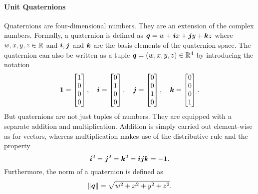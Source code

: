 		\paragraph{Unit Quaternions}
		Quaternions are four-dimensional numbers.
		They are an extension of the complex numbers. %
		Formally, a quaternion is defined as $\bm{q} = w + \bm{i}x + \bm{j}y + \bm{k}z$ where $w, x, y, z \in \mathbb{R}$ and $\bm{i},\bm{j}$ and $\bm{k}$ are the basis elements of the quaternion space.
		The quaternion can also be written as a tuple $\bm{q} = (w, x, y, z) \in \mathbb{R}^4$ by introducing the notation
		\begin{equation}
			\bm{1} = 
			\begin{bmatrix}
				1 \\ 
				0 \\ 
				0 \\ 
				0
			\end{bmatrix},\quad
			\bm{i} = 
			\begin{bmatrix}
				0 \\ 
				1 \\ 
				0 \\ 
				0
			\end{bmatrix},\quad
			\bm{j} = 
			\begin{bmatrix}
				0 \\ 
				0 \\ 
				1 \\ 
				0
			\end{bmatrix},\quad
			\bm{k} =
			\begin{bmatrix}
				0 \\ 
				0 \\ 
				0 \\ 
				1
			\end{bmatrix}.
		\end{equation}
		But quaternions are not just tuples of numbers. 
		They are equipped with a separate addition and multiplication.
		Addition is simply carried out element-wise as for vectors, whereas multiplication makes use of the distributive rule and the property
		\begin{equation}
			\bm{i}^2 = \bm{j}^2 = \bm{k}^2 = \bm{i}\bm{j}\bm{k} = -\bm{1}.
		\end{equation}
		Furthermore, the norm of a quaternion is defined as
		\begin{equation}
			\lVert \bm{q} \rVert = \sqrt{w^2 + x^2 + y^2 + z^2}.
		\end{equation}
